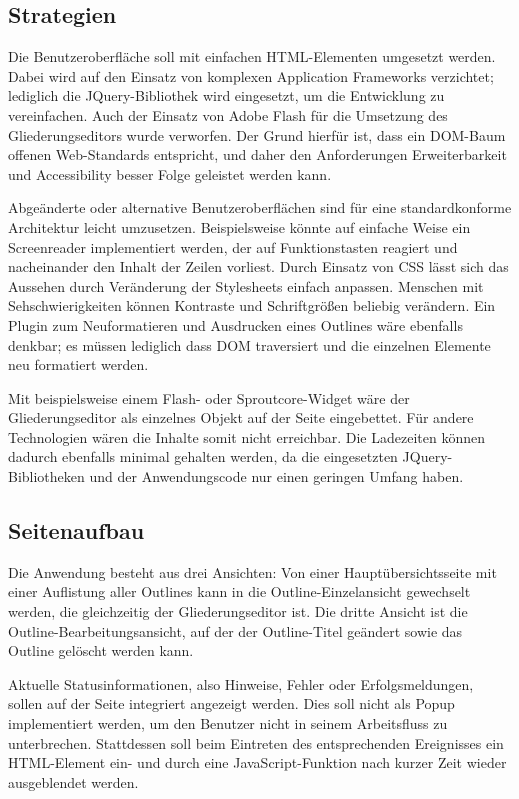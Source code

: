 \subsection{Strategien}

Die Benutzeroberfläche soll mit einfachen HTML-Elementen umgesetzt werden. Dabei wird auf den Einsatz von komplexen Application Frameworks verzichtet; lediglich die JQuery-Bibliothek wird eingesetzt, um die Entwicklung zu vereinfachen. Auch der Einsatz von Adobe Flash für die Umsetzung des Gliederungseditors wurde verworfen. Der Grund hierfür ist, dass ein DOM-Baum offenen Web-Standards entspricht, und daher den Anforderungen Erweiterbarkeit und Accessibility besser Folge geleistet werden kann.

Abgeänderte oder alternative Benutzeroberflächen sind für eine standardkonforme Architektur leicht umzusetzen. Beispielsweise könnte auf einfache Weise ein Screenreader implementiert werden, der auf Funktionstasten reagiert und nacheinander den Inhalt der Zeilen vorliest. Durch Einsatz von CSS lässt sich das Aussehen durch Veränderung der Stylesheets einfach anpassen. Menschen mit Sehschwierigkeiten können Kontraste und Schriftgrößen beliebig verändern. Ein Plugin zum Neuformatieren und Ausdrucken eines Outlines wäre ebenfalls denkbar; es müssen lediglich dass DOM traversiert und die einzelnen Elemente neu formatiert werden. 

Mit beispielsweise einem Flash- oder Sproutcore-Widget \cite{sproutcore:website} wäre der Gliederungseditor als einzelnes Objekt auf der Seite eingebettet. Für andere Technologien wären die Inhalte somit nicht erreichbar. Die Ladezeiten können dadurch ebenfalls minimal gehalten werden, da die eingesetzten JQuery-Bibliotheken und der Anwendungscode nur einen geringen Umfang haben. 


\subsection{Seitenaufbau}

Die Anwendung besteht aus drei Ansichten: Von einer Hauptübersichtsseite mit einer Auflistung aller Outlines kann in die Outline-Einzelansicht gewechselt werden, die gleichzeitig der Gliederungseditor ist. Die dritte Ansicht ist die Outline-Bearbeitungsansicht, auf der der Outline-Titel geändert sowie das Outline gelöscht werden kann. 

Aktuelle Statusinformationen, also Hinweise, Fehler oder Erfolgsmeldungen, sollen auf der Seite integriert angezeigt werden. Dies soll nicht als Popup implementiert werden, um den Benutzer nicht in seinem Arbeitsfluss zu unterbrechen. Stattdessen soll beim Eintreten des entsprechenden Ereignisses ein HTML-Element ein- und durch eine JavaScript-Funktion nach kurzer Zeit wieder ausgeblendet werden.

